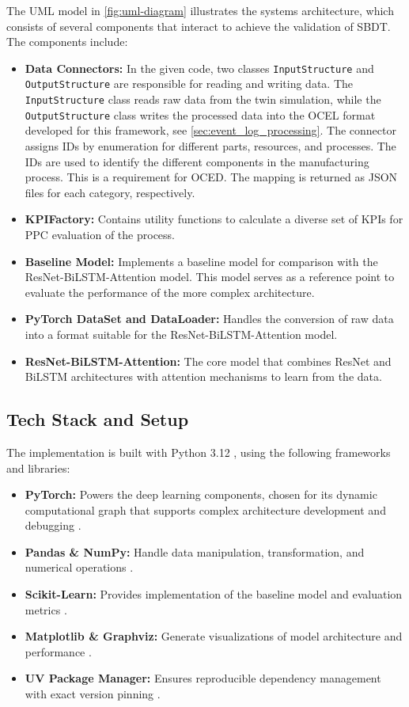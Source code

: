 The UML model \autocite{PlantUML} in \autoref{fig:uml-diagram} illustrates the systems architecture, which consists of several components that interact to achieve the validation of SBDT. The components include:
\begin{itemize}
  \item \textbf{Data Connectors:} In the given code, two classes \texttt{InputStructure} and \texttt{OutputStructure} are responsible for reading and writing data. The \texttt{InputStructure} class reads raw data from the twin simulation, while the \texttt{OutputStructure} class writes the processed data into the OCEL format developed for this framework, see \autoref{sec:event_log_processing}. The connector assigns IDs by enumeration for different parts, resources, and processes. The IDs are used to identify the different components in the manufacturing process. This is a requirement for OCED. The mapping is returned as JSON files for each category, respectively.
  \item \textbf{KPIFactory:} Contains utility functions to calculate a diverse set of KPIs for PPC evaluation of the process.
  \item \textbf{Baseline Model:} Implements a baseline model for comparison with the ResNet-BiLSTM-Attention model. This model serves as a reference point to evaluate the performance of the more complex architecture.
  \item \textbf{PyTorch DataSet and DataLoader:} Handles the conversion of raw data into a format suitable for the ResNet-BiLSTM-Attention model.
  \item \textbf{ResNet-BiLSTM-Attention:} The core model that combines ResNet and BiLSTM architectures with attention mechanisms to learn from the data.
\end{itemize}

\subsection{Tech Stack and Setup}
The implementation is built with Python 3.12 \autocite{Python}, using the following frameworks and libraries:

\begin{itemize}
  \item \textbf{PyTorch:} Powers the deep learning components, chosen for its dynamic computational graph that supports complex architecture development and debugging \autocite{PyTorch}.
  \item \textbf{Pandas \& NumPy:} Handle data manipulation, transformation, and numerical operations \autocite{NumPy, Pandas}.
  \item \textbf{Scikit-Learn:} Provides implementation of the baseline model and evaluation metrics \autocite{Scikit-Learn}.
  \item \textbf{Matplotlib \& Graphviz:} Generate visualizations of model architecture and performance \autocite{Matplotlib, Graphviz}.
  \item \textbf{UV Package Manager:} Ensures reproducible dependency management with exact version pinning \autocite{UV}.
\end{itemize}

